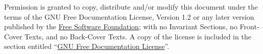 Permission is granted to copy, distribute and/or modify this document
under the terms of the GNU Free Documentation License, Version 1.2
or any later version published by the
\hyperlink{http://www.fsf.org}{Free Software Foundation};
with no Invariant Sections, no Front-Cover Texts, and no Back-Cover Texts.
A copy of the license is included in the section entitled
``\hyperlink{GFDL_GFDL}{GNU Free Documentation License}''.
